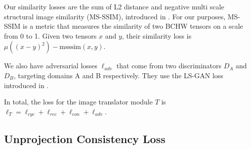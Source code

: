 \documentclass{article}
\begin{document}
	Our similarity losses are the sum of L2 distance and negative multi scale structural image similarity (MS-SSIM), introduced in \citep{msssim}. For our purposes, MS-SSIM is a metric that measures the similarity of two BCHW tensors on a scale from 0 to 1. Given two tensors $x$ and $y$, their similarity loss is $\mu\left((x-y)^2\right) - \text{msssim}(x,y)$. 

	We also have adversarial losses $\ell_{adv}$ that come from two discriminators $D_A$ and $D_B$, targeting domains A and B respectively. They use the LS-GAN loss introduced in \citep{lsgan}.

	In total, the loss for the image translator module $T$ is $\ell_T=\ell_{cyc}+\ell_{rec}+\ell_{con}+\ell_{adv}$.





\subsection{Unprojection Consistency Loss}
\label{sec:unprojection_consistency_loss}
\end{document}
